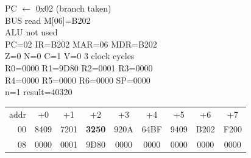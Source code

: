 \begin{tcolorbox}[stepbox, title={Step 37 \hfill PC 06 \quad BNE loop}]
PC $\leftarrow$ 0x02 (branch taken)\\
\textcolor{dim}{BUS} read M[06]=B202\\
\textcolor{dim}{ALU} \textcolor{dim}{not used}\\
PC=02 IR=B202 MAR=06 MDR=B202\\
Z=0 N=0 C=1 V=0 \hfill \textcolor{dim}{3 clock cycles}\\
R0=0000 R1=9D80 R2=0001 R3=0000\\
R4=0000 R5=0000 R6=0000 SP=0000\\
\textcolor{dim}{n=1  result=40320}\\[1pt]
{\setlength{\tabcolsep}{1.6pt}\begin{tabular}{@{}r*{8}{c}@{}}
\textcolor{dim}{addr} & \textcolor{dim}{+0} & \textcolor{dim}{+1} & \textcolor{dim}{+2} & \textcolor{dim}{+3} & \textcolor{dim}{+4} & \textcolor{dim}{+5} & \textcolor{dim}{+6} & \textcolor{dim}{+7}\\
\textcolor{dim}{00} & 8409 & 7201 & \cellcolor{pcc}\textbf{3250} & 920A & 64BF & 9409 & B202 & F200\\
\textcolor{dim}{08} & 0000 & \cellcolor{datac}0001 & \cellcolor{datac}9D80 & 0000 & 0000 & 0000 & 0000 & 0000\\
\end{tabular}}
\end{tcolorbox}\par\vspace{3pt}
